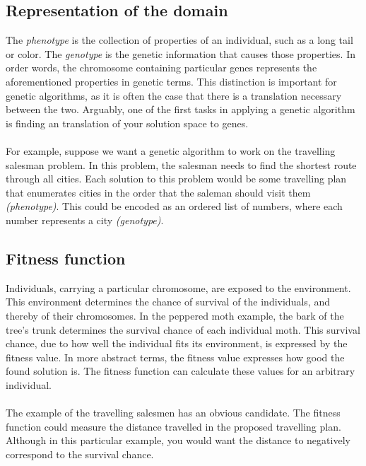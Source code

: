 \subsection{Representation of the domain}
The \emph{phenotype} is the collection of properties of an individual, such as
a long tail or color. The \emph{genotype} is the genetic information that
causes those properties. In order words, the chromosome containing particular
genes represents the aforementioned properties in genetic terms. This
distinction is important for genetic algorithms, as it is often the case that
there is a translation necessary between the two. Arguably, one of the first
tasks in applying a genetic algorithm is finding an translation of your
solution space to genes.\\\\
\noindent
For example, suppose we want a genetic algorithm to work on the travelling
salesman problem. In this problem, the salesman needs to find the shortest
route through all cities. Each solution to this problem would be some
travelling plan that enumerates cities in the order that the saleman should
visit them \textit{(phenotype)}. This could be encoded as an ordered list of
numbers, where each number represents a city \textit{(genotype)}.
\subsection{Fitness function}
Individuals, carrying a particular chromosome, are exposed to the environment.
This environment determines the chance of survival of the individuals, and
thereby of their chromosomes. In the peppered moth example, the bark of the
tree's trunk determines the survival chance of each individual moth. This
survival chance, due to how well the individual fits its environment, is
expressed by the fitness value. In more abstract terms, the fitness value
expresses how good the found solution is. The fitness function can calculate
these values for an arbitrary individual.\\\\
\noindent
The example of the travelling salesmen has an obvious candidate. The fitness
function could measure the distance travelled in the proposed travelling plan.
Although in this particular example, you would want the distance to negatively
correspond to the survival chance.

